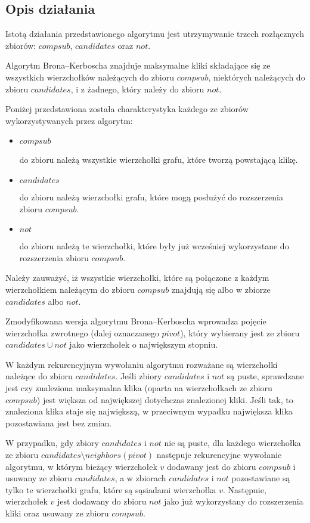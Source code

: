 \documentclass[12pt, a4paper]{article}
\begin{document}
\newpage
\subsection{Opis działania}
Istotą działania przedstawionego algorytmu jest utrzymywanie trzech rozłącznych zbiorów: $compsub$, $candidates$ oraz $not$.

Algorytm Brona--Kerboscha znajduje maksymalne kliki składające się ze wszystkich wierzchołków należących do zbioru $compsub$, niektórych należących do zbioru $candidates$, i z żadnego, który należy do zbioru $not$.

Poniżej przedstawiona została charakterystyka każdego ze zbiorów wykorzystywanych przez algorytm:
\begin{itemize}
	\item $compsub$ 
	
	do zbioru należą wszystkie wierzchołki grafu, które tworzą powstającą klikę.
	\item $candidates$
	
	do zbioru należą wierzchołki grafu, które mogą posłużyć do rozszerzenia zbioru $compsub$.
	\item $not$ 
	
	do zbioru należą te wierzchołki, które były już wcześniej wykorzystane do rozszerzenia zbioru $compsub$.
\end{itemize}

Należy zauważyć, iż wszystkie wierzchołki, które są połączone z każdym wierzchołkiem należącym do zbioru $compsub$ znajdują się albo w zbiorze $candidates$ albo $not$.

\bigskip
Zmodyfikowana wersja algorytmu Brona--Kerboscha wprowadza pojęcie wierzchołka zwrotnego (dalej oznaczanego $pivot$), który wybierany jest ze zbioru $candidates \cup not$ jako wierzchołek o największym stopniu.

\bigskip
W każdym rekurencyjnym wywołaniu algorytmu rozważane są wierzchołki należące do zbioru $candidates$. Jeśli zbiory $candidates$ i $not$ są puste, sprawdzane jest czy znaleziona maksymalna klika (oparta na wierzchołkach ze zbioru $compsub$) jest większa od największej dotychczas znalezionej kliki. Jeśli tak, to znaleziona klika staje się największą, w przeciwnym wypadku największa klika pozostawiana jest bez zmian.

W przypadku, gdy zbiory $candidates$ i $not$ nie są puste, dla każdego wierzchołka ze zbioru $candidates \setminus neighbors(pivot)$ następuje rekurencyjne wywołanie algorytmu, w którym bieżący wierzchołek $v$ dodawany jest do zbioru $compsub$ i usuwany ze zbioru $candidates$, a w zbiorach $candidates$ i $not$ pozostawiane są tylko te wierzchołki grafu, które są sąsiadami wierzchołka $v$. Następnie, wierzchołek $v$ jest dodawany do zbioru $not$ jako już wykorzystany do rozszerzenia kliki oraz usuwany ze zbioru $compsub$.
\end{document}
